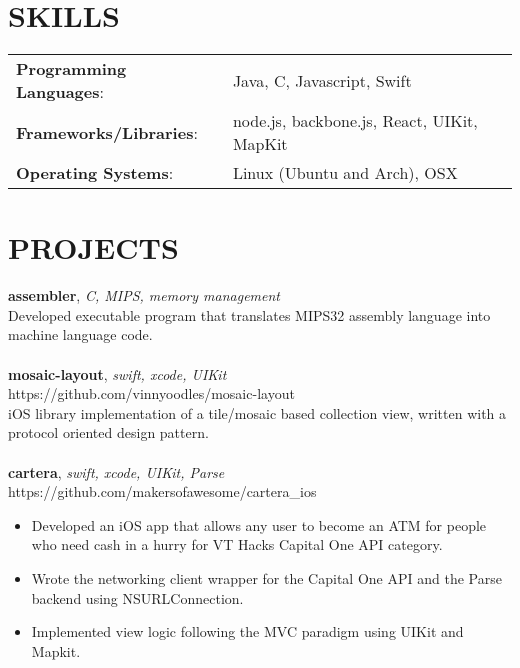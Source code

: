 \documentclass[line,margin]{res}
\begin{document}
\begin{resume}
	\section{SKILLS}
	\begin{tabular}{@{}ll}
		\textbf{Programming Languages}: & Java, C, Javascript, Swift   \\
		\textbf{Frameworks/Libraries}:  & node.js, backbone.js, React, UIKit, MapKit  \\
		\textbf{Operating Systems}:     & Linux (Ubuntu and Arch), OSX \\
	\end{tabular}
	\section{PROJECTS}
	\textbf{assembler}, {\sl C, MIPS, memory management}\\ Developed executable program that translates MIPS32 assembly language into machine language code.\\\\
	\textbf{mosaic-layout}, {\sl swift, xcode, UIKit}\\ https://github.com/vinnyoodles/mosaic-layout\\iOS library implementation of a tile/mosaic based collection view, written with a protocol oriented design pattern.\\\\
	\textbf{cartera}, {\sl swift, xcode, UIKit, Parse}\\ https://github.com/makersofawesome/cartera\_ios\\\begin{itemize} \itemsep 1pt
	\item Developed an iOS app that allows any user to become an ATM for people who need cash in a hurry for VT Hacks Capital One API category. 
	\item Wrote the networking client wrapper for the Capital One API and the Parse backend using NSURLConnection. 
	\item Implemented view logic following the MVC paradigm using UIKit and Mapkit.
	\end{itemize}
	          
	\ 
\end{resume}
\end{document}
